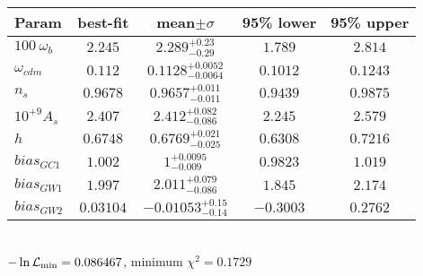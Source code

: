 \begin{tabular}{|l|c|c|c|c|} 
 \hline 
Param & best-fit & mean$\pm\sigma$ & 95\% lower & 95\% upper \\ \hline 
$100~\omega_{b }$ &$2.245$ & $2.289_{-0.29}^{+0.23}$ & $1.789$ & $2.814$ \\ 
$\omega_{cdm }$ &$0.112$ & $0.1128_{-0.0064}^{+0.0052}$ & $0.1012$ & $0.1243$ \\ 
$n_{s }$ &$0.9678$ & $0.9657_{-0.011}^{+0.011}$ & $0.9439$ & $0.9875$ \\ 
$10^{+9}A_{s }$ &$2.407$ & $2.412_{-0.086}^{+0.082}$ & $2.245$ & $2.579$ \\ 
$h$ &$0.6748$ & $0.6769_{-0.025}^{+0.021}$ & $0.6308$ & $0.7216$ \\ 
$bias_{GC 1 }$ &$1.002$ & $1_{-0.009}^{+0.0095}$ & $0.9823$ & $1.019$ \\ 
$bias_{GW 1 }$ &$1.997$ & $2.011_{-0.086}^{+0.079}$ & $1.845$ & $2.174$ \\ 
$bias_{GW 2 }$ &$0.03104$ & $-0.01053_{-0.14}^{+0.15}$ & $-0.3003$ & $0.2762$ \\ 
\hline 
 \end{tabular} \\ 
$-\ln{\cal L}_\mathrm{min} =0.086467$, minimum $\chi^2=0.1729$ \\ 
